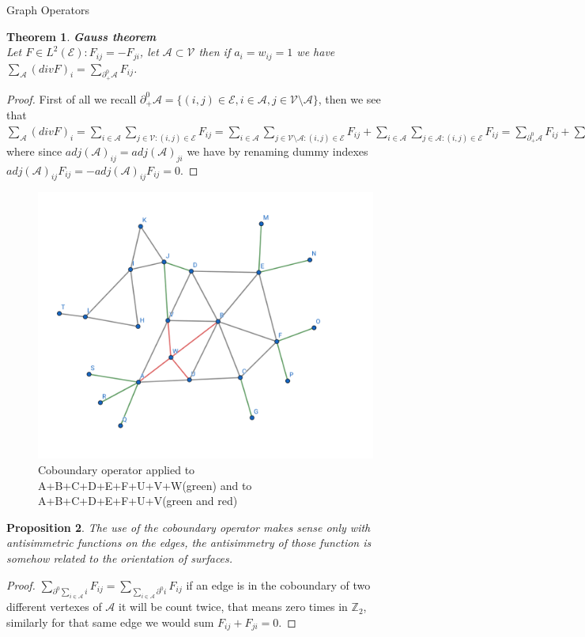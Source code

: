 \documentclass{article}
\newtheorem{thm}{Theorem}[section]
\newtheorem{prop}[thm]{Proposition}
\newcommand{\bb}[1]{\textbf{#1}}
\newcommand{\Z}{\mathbb{Z}}
\newcommand{\mc}{\mathcal}
\begin{document}
\begin{section}{Graph Operators}
	\begin{thm}
	    \bb{Gauss theorem}\\
	    Let $F \in L^2(\mc{E}) : F_{ij}=-F_{ji}$, let $\mc{A} \subset \mc{V}$ then if $a_i = w_{ij} = 1$ we have
	    $\sum_{\mc{A}} (divF)_i = \sum_{\partial_+^0 \mc{A}} F_{ij}$.
	\end{thm}
	\begin{proof}
	    First of all we recall $\partial_+^0 \mc{A} = \{ (i,j) \in \mc{E}, i \in \mc{A}, j \in \mc{V \setminus A} \}$, then we see that
            $\sum_{\mc{A}} (divF)_i = \sum_{i \in \mc{A}}\sum_{j \in \mc{V} : (i,j) \in \mc{E}} F_{ij} =
	    \sum_{i \in \mc{A}}\sum_{j \in \mc{V \setminus A} : (i,j) \in \mc{E}} F_{ij} +
            \sum_{i \in \mc{A}}\sum_{j \in \mc{A} : (i,j) \in \mc{E}} F_{ij} = \sum_{\partial_+^0 \mc{A}} F_{ij} + \sum_{(i,j) \in \mc{A}^2} adj(\mc{A})_{ij} F_{ij}$
	    where since $adj(\mc{A})_{ij} = adj(\mc{A})_{ji}$ we have by renaming dummy indexes $adj(\mc{A})_{ij} F_{ij} = -adj(\mc{A})_{ij} F_{ij} = 0$.
        \end{proof}
	\begin{figure}[h]
	    \caption{Coboundary operator applied to A+B+C+D+E+F+U+V+W(green) and to A+B+C+D+E+F+U+V(green and red)}
	    \centering
            \includegraphics[scale = 0.3]{images/cobordo.jpg}
	\end{figure}
	
	\begin{prop}
	    The use of the coboundary operator makes sense only with antisimmetric functions on the edges, the antisimmetry of
	    those function is somehow related to the orientation of surfaces.
	\end{prop}
	\begin{proof}
	    $\sum_{\partial^0 \sum_{i \in \mc{A}} i}F_{ij} = \sum_{\sum_{i \in \mc{A}} \partial^0 i} F_{ij}$ if an edge
	    is in the coboundary of two different vertexes of $\mc{A}$ it will be count twice, that means zero times in $\Z_2$,
	    similarly for that same edge we would sum $F_{ij} + F_{ji} = 0$.
	\end{proof}


\end{section}
\end{document}
